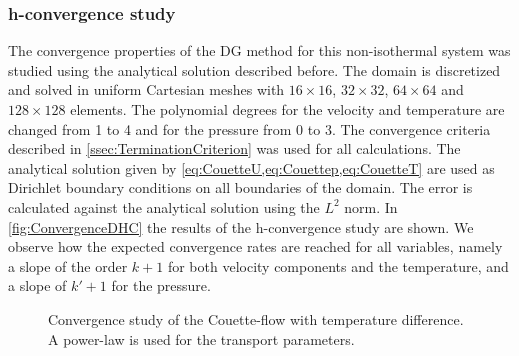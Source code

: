 \subsubsection{h-convergence study}
The convergence properties of the DG method for this non-isothermal system was studied using the analytical solution described before. The domain is discretized and solved in uniform Cartesian meshes with $16\times16$, $32\times32$, $64\times64$ and $128\times128$ elements. The polynomial degrees for the velocity and temperature are changed from 1 to 4 and for the pressure from 0 to 3. The convergence criteria described in \cref{ssec:TerminationCriterion} was used for all calculations. The  analytical solution given by \cref{eq:CouetteU,eq:Couettep,eq:CouetteT} are used as Dirichlet boundary conditions on all boundaries of the domain. The error is calculated against the analytical solution using the $L^2$ norm. %
In \cref{fig:ConvergenceDHC} the results of the h-convergence study are shown. We observe how the expected convergence rates are reached for all variables, namely a slope of the order $k+1$ for both velocity components and the temperature, and a slope of $k'+1$ for the pressure.
\begin{figure}[t!]
	\centering
	\pgfplotsset{width=0.34\textwidth, compat=1.3}
	\caption{Convergence study of the Couette-flow with temperature difference. A power-law is used for the transport parameters.}\label{fig:ConvergenceCFTD}
\end{figure}

